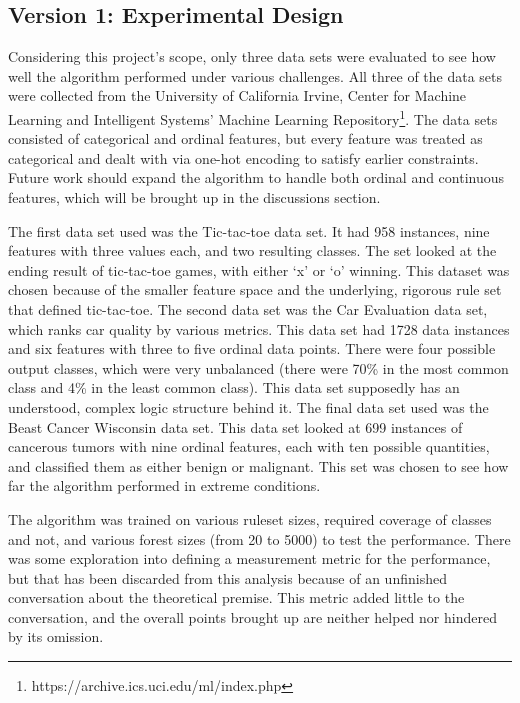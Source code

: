 \documentclass[11pt]{article}
\begin{document}
\subsection{Version 1: Experimental Design}
Considering this project's scope, only three data sets were evaluated to see how well the algorithm performed under various challenges. All three of the data sets were collected from the University of California Irvine, Center for Machine Learning and Intelligent Systems' Machine Learning Repository\footnote{https://archive.ics.uci.edu/ml/index.php}. The data sets consisted of categorical and ordinal features, but every feature was treated as categorical and dealt with via one-hot encoding to satisfy earlier constraints. Future work should expand the algorithm to handle both ordinal and continuous features, which will be brought up in the discussions section.

The first data set used was the Tic-tac-toe data set. It had 958 instances, nine features with three values each, and two resulting classes. The set looked at the ending result of tic-tac-toe games, with either `x' or `o' winning. This dataset was chosen because of the smaller feature space and the underlying, rigorous rule set that defined tic-tac-toe. The second data set was the Car Evaluation data set, which ranks car quality by various metrics. This data set had 1728 data instances and six features with three to five ordinal data points. There were four possible output classes, which were very unbalanced (there were 70\% in the most common class and 4\% in the least common class). This data set supposedly has an understood, complex logic structure behind it. The final data set used was the Beast Cancer Wisconsin data set. This data set looked at 699 instances of cancerous tumors with nine ordinal features, each with ten possible quantities, and classified them as either benign or malignant. This set was chosen to see how far the algorithm performed in extreme conditions.

The algorithm was trained on various ruleset sizes, required coverage of classes and not, and various forest sizes (from 20 to 5000) to test the performance. There was some exploration into defining a measurement metric for the performance, but that has been discarded from this analysis because of an unfinished conversation about the theoretical premise. This metric added little to the conversation, and the overall points brought up are neither helped nor hindered by its omission.
\end{document}
